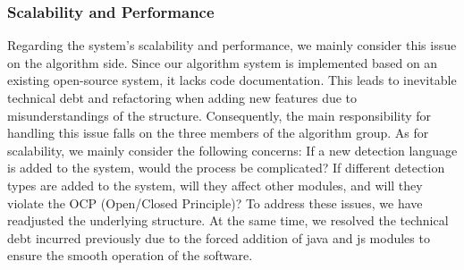 \subsubsection{Scalability and Performance} 
Regarding the system's scalability and performance, we mainly consider this issue on the algorithm side. Since our algorithm system is implemented based on an existing open-source system, it lacks code documentation. This leads to inevitable technical debt and refactoring when adding new features due to misunderstandings of the structure. Consequently, the main responsibility for handling this issue falls on the three members of the algorithm group. As for scalability, we mainly consider the following concerns: If a new detection language is added to the system, would the process be complicated? If different detection types are added to the system, will they affect other modules, and will they violate the OCP (Open/Closed Principle)? To address these issues, we have readjusted the underlying structure. At the same time, we resolved the technical debt incurred previously due to the forced addition of java and js modules to ensure the smooth operation of the software.

